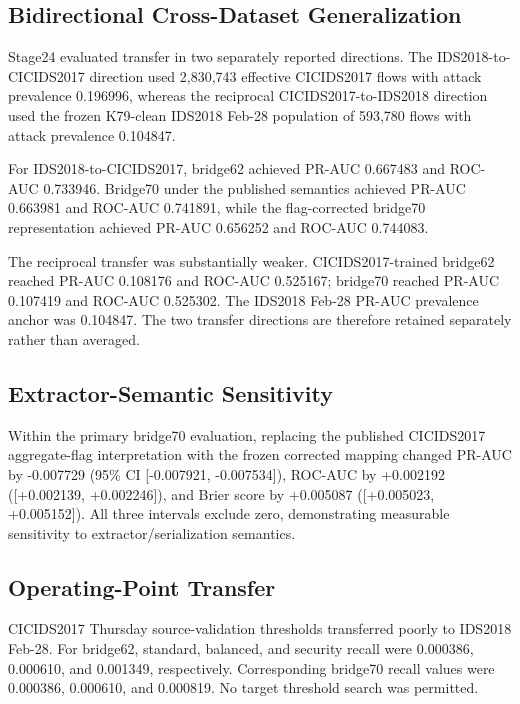 

\subsection{Bidirectional Cross-Dataset Generalization}

Stage24 evaluated transfer in two separately reported directions. The
IDS2018-to-CICIDS2017 direction used 2,830,743 effective
CICIDS2017 flows with attack prevalence 0.196996, whereas the
reciprocal CICIDS2017-to-IDS2018 direction used the frozen K79-clean IDS2018
Feb-28 population of 593,780 flows with attack prevalence
0.104847.

For IDS2018-to-CICIDS2017, bridge62 achieved PR-AUC
0.667483 and ROC-AUC
0.733946. Bridge70 under the
published semantics achieved PR-AUC
0.663981 and ROC-AUC
0.741891, while the flag-corrected
bridge70 representation achieved PR-AUC
0.656252 and ROC-AUC
0.744083.

The reciprocal transfer was substantially weaker. CICIDS2017-trained bridge62
reached PR-AUC 0.108176 and ROC-AUC
0.525167; bridge70 reached PR-AUC
0.107419 and ROC-AUC
0.525302. The IDS2018 Feb-28 PR-AUC
prevalence anchor was 0.104847. The two transfer directions
are therefore retained separately rather than averaged.

\subsection{Extractor-Semantic Sensitivity}

Within the primary bridge70 evaluation, replacing the published CICIDS2017
aggregate-flag interpretation with the frozen corrected mapping changed PR-AUC
by -0.007729
(95\% CI [-0.007921, -0.007534]),
ROC-AUC by +0.002192
([+0.002139, +0.002246]), and Brier
score by +0.005087
([+0.005023, +0.005152]).
All three intervals exclude zero, demonstrating measurable sensitivity to
extractor/serialization semantics.

\subsection{Operating-Point Transfer}

CICIDS2017 Thursday source-validation thresholds transferred poorly to IDS2018
Feb-28. For bridge62, standard, balanced, and security recall were
0.000386,
0.000610, and
0.001349,
respectively. Corresponding bridge70 recall values were
0.000386,
0.000610, and
0.000819.
No target threshold search was permitted.

